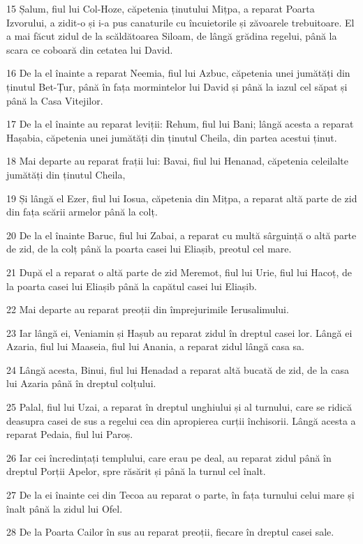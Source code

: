 \par 15 Șalum, fiul lui Col-Hoze, căpetenia ținutului Mițpa, a reparat Poarta Izvorului, a zidit-o și i-a pus canaturile cu încuietorile și zăvoarele trebuitoare. El a mai făcut zidul de la scăldătoarea Siloam, de lângă grădina regelui, până la scara ce coboară din cetatea lui David.
\par 16 De la el înainte a reparat Neemia, fiul lui Azbuc, căpetenia unei jumătăți din ținutul Bet-Țur, până în fața mormintelor lui David și până la iazul cel săpat și până la Casa Vitejilor.
\par 17 De la el înainte au reparat leviții: Rehum, fiul lui Bani; lângă acesta a reparat Hașabia, căpetenia unei jumătăți din ținutul Cheila, din partea acestui ținut.
\par 18 Mai departe au reparat frații lui: Bavai, fiul lui Henanad, căpetenia celeilalte jumătăți din ținutul Cheila,
\par 19 Și lângă el Ezer, fiul lui Iosua, căpetenia din Mițpa, a reparat altă parte de zid din fața scării armelor până la colț.
\par 20 De la el înainte Baruc, fiul lui Zabai, a reparat cu multă sârguință o altă parte de zid, de la colț până la poarta casei lui Eliașib, preotul cel mare.
\par 21 După el a reparat o altă parte de zid Meremot, fiul lui Urie, fiul lui Hacoț, de la poarta casei lui Eliașib până la capătul casei lui Eliașib.
\par 22 Mai departe au reparat preoții din împrejurimile Ierusalimului.
\par 23 Iar lângă ei, Veniamin și Hașub au reparat zidul în dreptul casei lor. Lângă ei Azaria, fiul lui Maaseia, fiul lui Anania, a reparat zidul lângă casa sa.
\par 24 Lângă acesta, Binui, fiul lui Henadad a reparat altă bucată de zid, de la casa lui Azaria până în dreptul colțului.
\par 25 Palal, fiul lui Uzai, a reparat în dreptul unghiului și al turnului, care se ridică deasupra casei de sus a regelui cea din apropierea curții închisorii. Lângă acesta a reparat Pedaia, fiul lui Paroș.
\par 26 Iar cei încredințați templului, care erau pe deal, au reparat zidul până în dreptul Porții Apelor, spre răsărit și până la turnul cel înalt.
\par 27 De la ei înainte cei din Tecoa au reparat o parte, în fața turnului celui mare și înalt până la zidul lui Ofel.
\par 28 De la Poarta Cailor în sus au reparat preoții, fiecare în dreptul casei sale.
